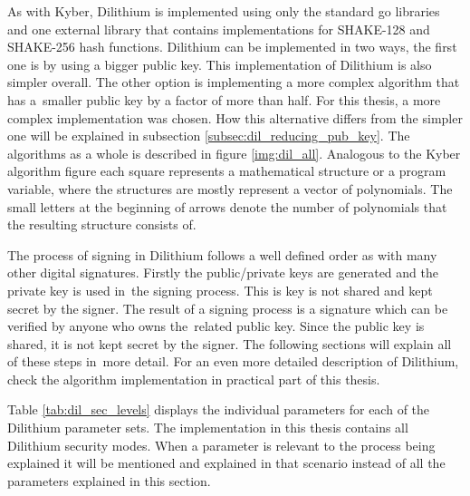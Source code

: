 As with Kyber, Dilithium is implemented using only the standard go libraries and one external library \cite{00fV2cvg7Z6H2tS3} that contains implementations for SHAKE-128 and SHAKE-256 hash functions. Dilithium can be implemented in two ways, the first one is by using a bigger public key. This implementation of Dilithium is also simpler overall. The other option is implementing a more complex algorithm that has a~smaller public key by a factor of more than half. For this thesis, a more complex implementation was chosen. How this alternative differs from the simpler one will be explained in subsection \ref{subsec:dil_reducing_pub_key}. The algorithms as a whole is described in figure \ref{img:dil_all}. Analogous to the Kyber algorithm figure each square represents a mathematical structure or a program variable, where the structures are mostly represent a vector of polynomials. The small letters at the beginning of arrows denote the number of polynomials that the resulting structure consists of.

The process of signing in Dilithium follows a well defined order as with many other digital signatures. Firstly the public/private keys are generated and the private key is used in~the signing process. This is key is not shared and kept secret by the signer. The result of a signing process is a signature which can be verified by anyone who owns the~related public key. Since the public key is shared, it is not kept secret by the signer. The following sections will explain all of these steps in~more detail. For an even more detailed description of Dilithium, check the algorithm implementation in practical part of this thesis.


Table \ref{tab:dil_sec_levels} displays the individual parameters for each of the Dilithium parameter sets. The implementation in this thesis contains all Dilithium security modes. When a parameter is relevant to the process being explained it will be mentioned and explained in that scenario instead of all the parameters explained in this section.
